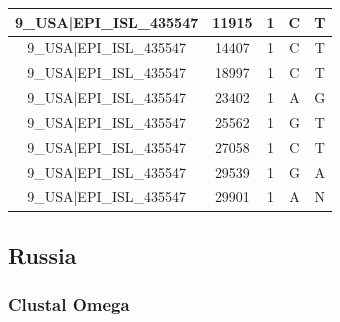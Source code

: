 \documentclass[a4paper,10pt]{article}
\begin{document}
\begin{longtable}{@{}ccccc@{}}
9\_USA|EPI\_ISL\_435547 & 11915 & 1 & C & T \\* \midrule
9\_USA|EPI\_ISL\_435547 & 14407 & 1 & C & T \\* \midrule
9\_USA|EPI\_ISL\_435547 & 18997 & 1 & C & T \\* \midrule
9\_USA|EPI\_ISL\_435547 & 23402 & 1 & A & G \\* \midrule
9\_USA|EPI\_ISL\_435547 & 25562 & 1 & G & T \\* \midrule
9\_USA|EPI\_ISL\_435547 & 27058 & 1 & C & T \\* \midrule
9\_USA|EPI\_ISL\_435547 & 29539 & 1 & G & A \\* \midrule
9\_USA|EPI\_ISL\_435547 & 29901 & 1 & A & N \\* \bottomrule
\end{longtable}

\subsection{Russia}
\subsubsection{Clustal Omega}
\end{document}
